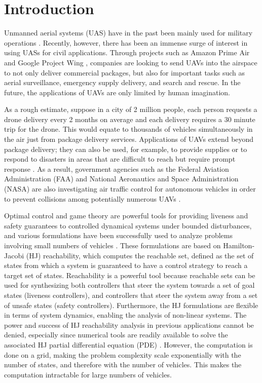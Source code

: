 \section{Introduction}
Unmanned aerial systems (UAS) have in the past been mainly used for military operations \cite{Tice91}. Recently, however, there has been an immense surge of interest in using UASs for civil applications. Through projects such as Amazon Prime Air \cite{PrimeAir} and Google Project Wing \cite{ProjectWing}, companies are looking to send UAVs into the airspace to not only deliver commercial packages, but also for important tasks such as aerial surveillance, emergency supply delivery, and search and rescue. In the future, the applications of UAVs are only limited by human imagination. 

As a rough estimate, suppose in a city of 2 million people, each person requests a drone delivery every 2 months on average and each delivery requires a 30 minute trip for the drone. This would equate to thousands of vehicles simultaneously in the air just from package delivery services. Applications of UAVs extend beyond package delivery; they can also be used, for example, to provide supplies or to respond to disasters in areas that are difficult to reach but require prompt response \cite{Debusk10,Tornado16}. As a result, government agencies such as the Federal Aviation Administration (FAA) and National Aeronautics and Space Administration (NASA) are also investigating air traffic control for autonomous vehicles in order to prevent collisions among potentially numerous UAVs \cite{FAA13, NASA16}. 

Optimal control and game theory are powerful tools for providing liveness and safety guarantees to controlled dynamical systems under bounded disturbances, and various formulations \cite{Bokanowski10,Mitchell05,Barron89} have been successfully used to analyze problems involving small numbers of vehicles \cite{Fisac15,Chen14,Ding08}. These formulations are based on Hamilton-Jacobi (HJ) reachability, which computes the reachable set, defined as the set of states from which a system is guaranteed to have a control strategy to reach a target set of states. Reachability is a powerful tool because reachable sets can be used for synthesizing both controllers that steer the system towards a set of goal states (liveness controllers), and controllers that steer the system away from a set of unsafe states (safety controllers). Furthermore, the HJ formulations are flexible in terms of system dynamics, enabling the analysis of non-linear systems. The power and success of HJ reachability analysis in previous applications cannot be denied, especially since numerical tools are readily available to solve the associated HJ partial differential equation (PDE) \cite{LSToolbox,Osher02,Sethian96}. However, the computation is done on a grid, making the problem complexity scale exponentially with the number of states, and therefore with the number of vehicles. This makes the computation intractable for large numbers of vehicles. 

